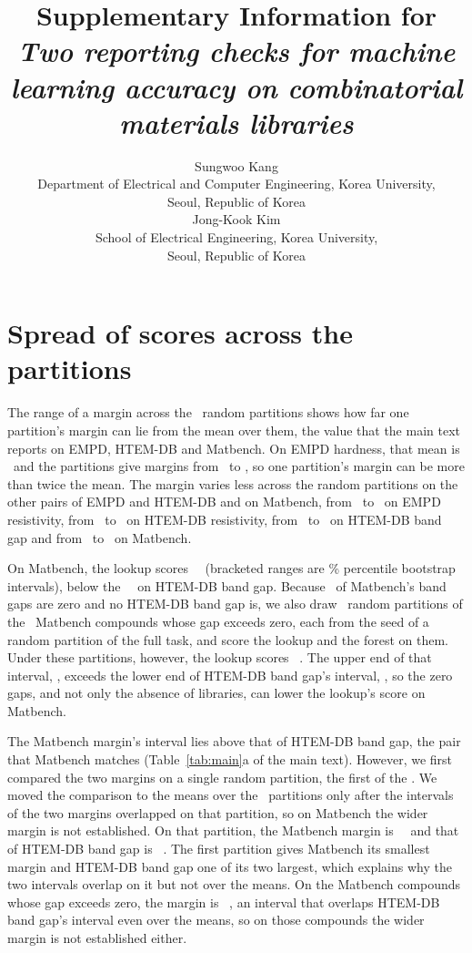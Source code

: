 \documentclass[11pt]{article}
\title{Supplementary Information for\\
       \emph{Two reporting checks for machine learning accuracy on
       combinatorial materials libraries}}
\author{Sungwoo Kang\\
  Department of Electrical and Computer Engineering, Korea University,\\
  Seoul, Republic of Korea\\[2ex]
  Jong-Kook Kim\\
  School of Electrical Engineering, Korea University,\\
  Seoul, Republic of Korea}
\date{}
\begin{document}
\maketitle

\section{Spread of scores across the partitions}
\label{sec:esi-draw-spread}

The range of a margin across the \splitDraws\ random partitions shows how far
one partition's margin can lie from the mean over them, the value that the main
text reports on EMPD, HTEM-DB and Matbench. On EMPD hardness, that
mean is \empdHardMargin\ and the partitions give margins from
\empdHardMarginMin\ to \empdHardMarginMax, so one partition's margin can be
more than twice the mean. The margin varies less across the random partitions
on the other pairs of EMPD and HTEM-DB and on Matbench, from \empdResMarginMin\ to \empdResMarginMax\ on
EMPD resistivity, from \htemResMarginMin\ to \htemResMarginMax\ on HTEM-DB
resistivity, from \htemGapMarginMin\ to \htemGapMarginMax\ on HTEM-DB band gap
and from \exptGapMarginMin\ to \exptGapMarginMax\ on Matbench.

On Matbench, the lookup scores \exptGapLookup\
\exptGapLookupCI\ (bracketed ranges are \bootstrapLevel\% percentile bootstrap
intervals), below the \htemGapRandomLookup\ \htemGapRandomLookupCI\ on HTEM-DB band
gap. Because \exptGapZeroShare\ of Matbench's band gaps are zero and no HTEM-DB
band gap is, we also draw \splitDraws\ random partitions of the
\exptGapNonzeroRows\ Matbench compounds whose gap exceeds zero, each from the seed
of a random partition of the full task, and score the lookup and the forest on
them. Under these partitions, however, the lookup scores \exptGapNonzeroLookup\
\exptGapNonzeroLookupCI. The upper end of that interval, \exptGapNonzeroLookupHi,
exceeds the lower end of HTEM-DB band gap's interval, \htemGapRandomLookupLo, so the
zero gaps, and not only the absence of libraries, can lower the lookup's score on
Matbench.

The Matbench margin's interval lies
above that of HTEM-DB band gap, the pair that Matbench matches
(Table~\ref{tab:main}a of the main text). However, we first compared the two margins on a
single random partition, the first of the \splitDraws. We moved the comparison
to the means over the \splitDraws\ partitions only after the intervals of the two margins overlapped on
that partition, so on Matbench the wider margin is not established. On that
partition, the Matbench margin is \exptGapFirstMargin\ \exptGapFirstMarginCI\
and that of HTEM-DB band gap is \htemGapFirstMargin\ \htemGapFirstMarginCI. The first partition gives Matbench its smallest margin and HTEM-DB band gap
one of its two largest, which explains why the two intervals overlap on it but not
over the means. On the Matbench compounds whose gap exceeds zero, the margin is \exptGapNonzeroMargin\ \exptGapNonzeroMarginCI, an interval that overlaps HTEM-DB band gap's interval even over the means, so
on those compounds the wider margin is not established either.
\end{document}
